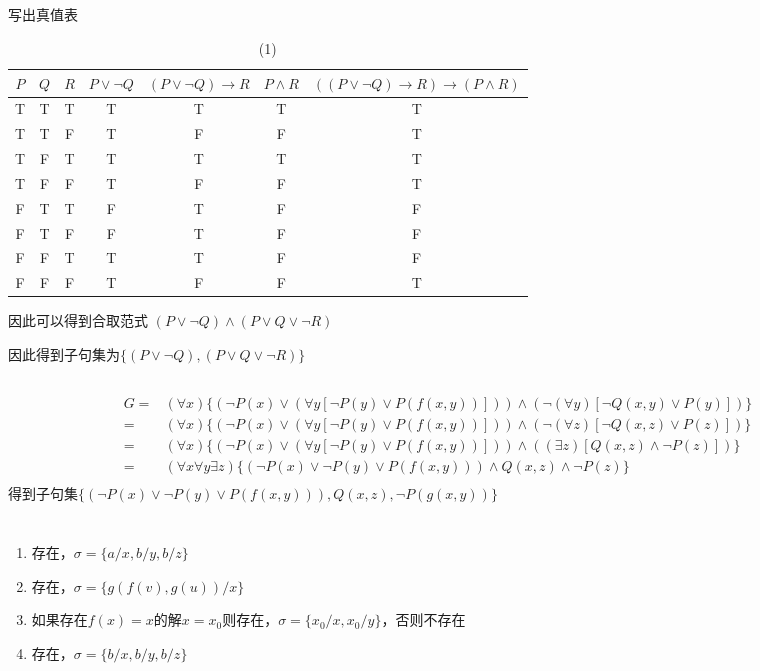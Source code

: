 \documentclass[UTF8,a4paper]{paper}
\begin{document}
\subsection{}
写出真值表
\begin{table}[H]
\centering
\caption{(1)}
\begin{tabular}{|c|c|c|c|c|c|c|}
\hline
$P$&$Q$&$R$&$P\lor\neg Q$&$(P\lor\neg Q)\rightarrow R$&$P\land R$&$((P\lor\neg Q)\rightarrow R)\rightarrow (P\land R)$\\
\hline
T&T&T&T&T&T&T\\
\hline
T&T&F&T&F&F&T\\
\hline
T&F&T&T&T&T&T\\
\hline
T&F&F&T&F&F&T\\
\hline
F&T&T&F&T&F&F\\
\hline
F&T&F&F&T&F&F\\
\hline
F&F&T&T&T&F&F\\
\hline
F&F&F&T&F&F&T\\
\hline
\end{tabular}
\end{table}
因此可以得到合取范式
$(P\lor\neg Q)\land(P\lor Q\lor\neg R)$

因此得到子句集为$\{(P\lor\neg Q),(P\lor Q\lor\neg R)\}$
\subsection{}
\begin{equation}\begin{aligned}
G=&(\forall x)\{(\neg P(x)\lor(\forall y [\neg P(y)\lor P(f(x,y))]))\land(\neg(\forall y)[\neg Q(x,y)\lor P(y)])\}\\
=&(\forall x)\{(\neg P(x)\lor(\forall y [\neg P(y)\lor P(f(x,y))]))\land(\neg(\forall z)[\neg Q(x,z)\lor P(z)])\}\\
=&(\forall x)\{(\neg P(x)\lor(\forall y [\neg P(y)\lor P(f(x,y))]))\land((\exists z)[Q(x,z)\land\neg P(z)])\}\\
=&(\forall x\forall y\exists z)\{(\neg P(x)\lor\neg P(y)\lor P(f(x,y)))\land Q(x,z)\land\neg P(z)\}\\
\end{aligned}\end{equation}
得到子句集$\{(\neg P(x)\lor\neg P(y)\lor P(f(x,y))), Q(x,z),\neg P(g(x,y))\}$
\section{}
\begin{enumerate}
\item 存在，$\sigma = \{a/x,b/y,b/z\}$
\item 存在，$\sigma = \{g(f(v),g(u))/x\}$
\item 如果存在$f(x)=x$的解$x=x_0$则存在，$\sigma = \{x_0/x,x_0/y\}$，否则不存在
\item 存在，$\sigma = \{b/x,b/y,b/z\}$
\end{enumerate}
\end{document}
